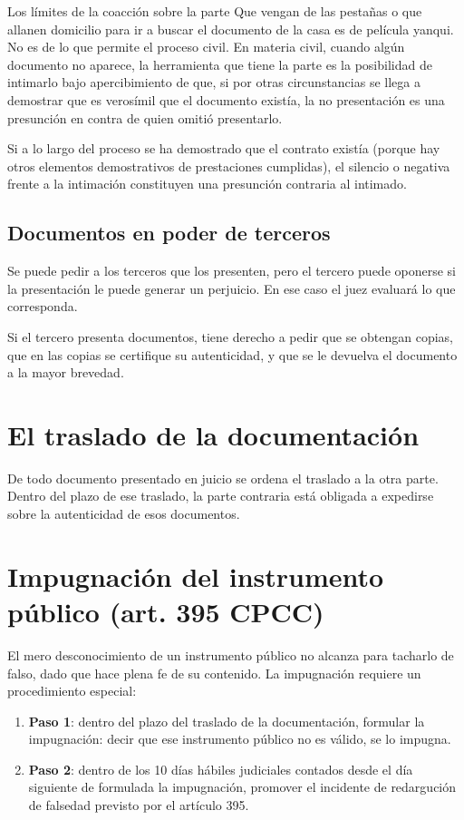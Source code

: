 \documentclass[12pt,oneside]{book}
\begin{document}
\begin{example}{Los límites de la coacción sobre la parte}
Que vengan de las pestañas o que allanen domicilio para ir a buscar el documento de la casa es de película yanqui. No es de lo que permite el proceso civil. En materia civil, cuando algún documento no aparece, la herramienta que tiene la parte es la posibilidad de intimarlo bajo apercibimiento de que, si por otras circunstancias se llega a demostrar que es verosímil que el documento existía, la no presentación es una presunción en contra de quien omitió presentarlo.
\end{example}

Si a lo largo del proceso se ha demostrado que el contrato existía (porque hay otros elementos demostrativos de prestaciones cumplidas), el silencio o negativa frente a la intimación constituyen una presunción contraria al intimado.

\subsection{Documentos en poder de terceros}

Se puede pedir a los terceros que los presenten, pero el tercero puede oponerse si la presentación le puede generar un perjuicio. En ese caso el juez evaluará lo que corresponda.

Si el tercero presenta documentos, tiene derecho a pedir que se obtengan copias, que en las copias se certifique su autenticidad, y que se le devuelva el documento a la mayor brevedad.

\section{El traslado de la documentación}

De todo documento presentado en juicio se ordena el traslado a la otra parte. Dentro del plazo de ese traslado, la parte contraria está obligada a expedirse sobre la autenticidad de esos documentos.

\section{Impugnación del instrumento público (art. 395 CPCC)}

El mero desconocimiento de un instrumento público no alcanza para tacharlo de falso, dado que hace plena fe de su contenido. La impugnación requiere un procedimiento especial:

\begin{enumerate}
    \item \textbf{Paso 1}: dentro del plazo del traslado de la documentación, formular la impugnación: decir que ese instrumento público no es válido, se lo impugna.
    \item \textbf{Paso 2}: dentro de los 10 días hábiles judiciales contados desde el día siguiente de formulada la impugnación, promover el incidente de redargución de falsedad previsto por el artículo 395.
\end{enumerate}
\end{document}
